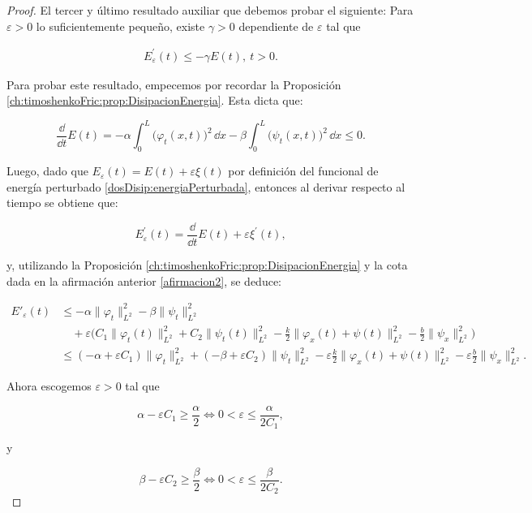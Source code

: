 \begin{proof}
    El tercer y último resultado auxiliar que debemos probar el siguiente: Para $\varepsilon > 0$ lo suficientemente pequeño, existe $\gamma > 0$ dependiente de $\varepsilon$ tal que

    \begin{align}
        \label{afirmacion3}
        E_\varepsilon^\prime(t) \leq -\gamma E(t), \ t > 0.
    \end{align}

    Para probar este resultado, empecemos por recordar la Proposición \eqref{ch:timoshenkoFric:prop:DisipacionEnergia}. Esta dicta que:

    \[\frac{\dd}{\dd t}E(t) = -\alpha\int_0^L \big(\varphi_t(x, t)\big)^2 \, \dd x -\beta\int_0^L \big(\psi_t(x, t)\big)^2 \, \dd x \leq 0.\]

    Luego, dado que $E_\varepsilon(t) = E(t) + \varepsilon\xi(t)$ por definición del funcional de energía perturbado \eqref{dosDisip:energiaPerturbada}, entonces al derivar respecto al tiempo se obtiene que:

    \[E^\prime_\varepsilon(t) = \frac{\dd}{\dd t}E(t) + \varepsilon\xi^\prime(t),\]

    y, utilizando la Proposición \eqref{ch:timoshenkoFric:prop:DisipacionEnergia} y la cota dada en la afirmación anterior \eqref{afirmacion2}, se deduce:

    \begin{align*}
        E'_\varepsilon(t) &\leq -\alpha \lVert \varphi_t \rVert^2_{L^2} -\beta \lVert \psi_t \rVert^2_{L^2} \\
        &\quad + \varepsilon \Biggl(C_1 \lVert \varphi_t(t) \rVert^2_{L^2} + C_2 \lVert \psi_t(t) \rVert^2_{L^2} - \frac{k}{2} \lVert \varphi_x(t) + \psi(t) \rVert^2_{L^2} - \frac{b}{2} \lVert \psi_x \rVert^2_{L^2} \Biggr) \\
        &\leq (-\alpha + \varepsilon C_1)\lVert \varphi_t \rVert^2_{L^2} + ( -\beta + \varepsilon C_2)\lVert \psi_t \rVert^2_{L^2} - \varepsilon \frac{k}{2} \lVert \varphi_x(t) + \psi(t) \rVert^2_{L^2} - \varepsilon \frac{b}{2} \lVert \psi_x \rVert^2_{L^2}.
    \end{align*}

    Ahora escogemos $\varepsilon > 0$ tal que

    \[\alpha - \varepsilon C_1 \geq \frac{\alpha}{2} \iff 0< \varepsilon \leq \frac{\alpha}{2C_1},\]

    y

    \[\beta - \varepsilon C_2 \geq \frac{\beta}{2} \iff 0< \varepsilon \leq \frac{\beta}{2C_2}.\]


\end{proof}
